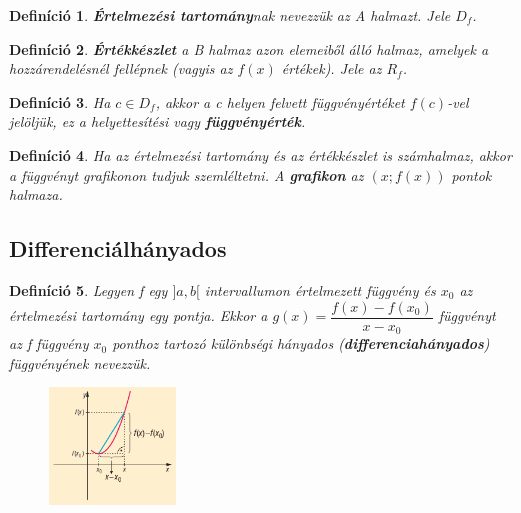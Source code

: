 \documentclass[12pt,a4paper]{article}
\newtheorem{definition}{Definíció} [section]
\begin{document}
\begin{definition}
\textbf{Értelmezési tartomány}nak nevezzük az A halmazt. Jele $D_f$.
\end{definition}

\begin{definition}
\textbf{Értékkészlet} a B halmaz azon elemeiből álló halmaz, amelyek a hozzárendelésnél fellépnek (vagyis az $f(x)$ értékek). Jele az $R_f$.
\end{definition}

\begin{definition}
Ha $c \in D_f$, akkor a c helyen felvett függvényértéket $f(c)$-vel jelöljük, ez a helyettesítési vagy \textbf{függvényérték}.
\end{definition}

\begin{definition}
Ha az értelmezési tartomány és az értékkészlet is számhalmaz, akkor a függvényt grafikonon tudjuk szemléltetni. A \textbf{grafikon} az $(x; f(x))$ pontok halmaza.
\end{definition}

\subsection{Differenciálhányados}

\begin{definition}
Legyen f egy $]a, b[$ intervallumon értelmezett függvény és $x_0$ az értelmezési tartomány egy pontja. Ekkor a $g(x)=\dfrac{f(x)-f(x_0)}{x-x_0}$ függvényt az f függvény $x_0$ ponthoz tartozó különbségi hányados (\textbf{differenciahányados}) függvényének nevezzük.
\begin{figure}[h]
\centering
\includegraphics[width=0.3\textwidth]{differencialhanyados}
\end{figure}
\end{definition}
\end{document}
